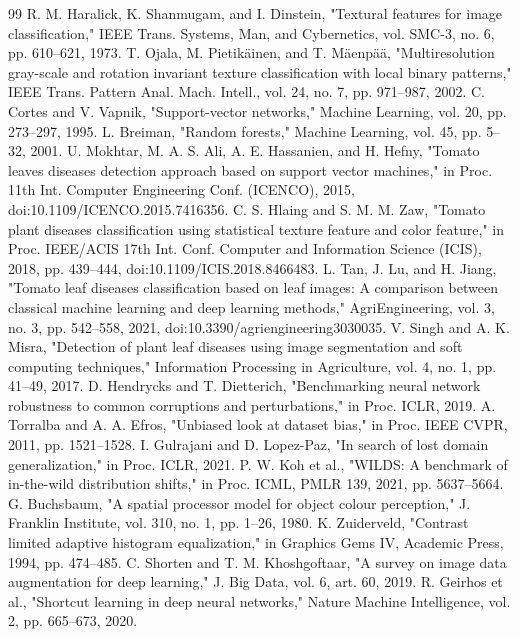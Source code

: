 \documentclass[conference]{IEEEtran}
\begin{document}
\begin{thebibliography}{99}
 R. M. Haralick, K. Shanmugam, and I. Dinstein, "Textural features for image classification," IEEE Trans. Systems, Man, and Cybernetics, vol. SMC-3, no. 6, pp. 610--621, 1973.
 T. Ojala, M. Pietikäinen, and T. Mäenpää, "Multiresolution gray-scale and rotation invariant texture classification with local binary patterns," IEEE Trans. Pattern Anal. Mach. Intell., vol. 24, no. 7, pp. 971--987, 2002.
 C. Cortes and V. Vapnik, "Support-vector networks," Machine Learning, vol. 20, pp. 273--297, 1995.
 L. Breiman, "Random forests," Machine Learning, vol. 45, pp. 5--32, 2001.
 U. Mokhtar, M. A. S. Ali, A. E. Hassanien, and H. Hefny, "Tomato leaves diseases detection approach based on support vector machines," in Proc. 11th Int. Computer Engineering Conf. (ICENCO), 2015, doi:10.1109/ICENCO.2015.7416356.
 C. S. Hlaing and S. M. M. Zaw, "Tomato plant diseases classification using statistical texture feature and color feature," in Proc. IEEE/ACIS 17th Int. Conf. Computer and Information Science (ICIS), 2018, pp. 439--444, doi:10.1109/ICIS.2018.8466483.
 L. Tan, J. Lu, and H. Jiang, "Tomato leaf diseases classification based on leaf images: A comparison between classical machine learning and deep learning methods," AgriEngineering, vol. 3, no. 3, pp. 542--558, 2021, doi:10.3390/agriengineering3030035.
 V. Singh and A. K. Misra, "Detection of plant leaf diseases using image segmentation and soft computing techniques," Information Processing in Agriculture, vol. 4, no. 1, pp. 41--49, 2017.
 D. Hendrycks and T. Dietterich, "Benchmarking neural network robustness to common corruptions and perturbations," in Proc. ICLR, 2019.
 A. Torralba and A. A. Efros, "Unbiased look at dataset bias," in Proc. IEEE CVPR, 2011, pp. 1521--1528.
 I. Gulrajani and D. Lopez-Paz, "In search of lost domain generalization," in Proc. ICLR, 2021.
 P. W. Koh et al., "WILDS: A benchmark of in-the-wild distribution shifts," in Proc. ICML, PMLR 139, 2021, pp. 5637--5664.
 G. Buchsbaum, "A spatial processor model for object colour perception," J. Franklin Institute, vol. 310, no. 1, pp. 1--26, 1980.
 K. Zuiderveld, "Contrast limited adaptive histogram equalization," in Graphics Gems IV, Academic Press, 1994, pp. 474--485.
 C. Shorten and T. M. Khoshgoftaar, "A survey on image data augmentation for deep learning," J. Big Data, vol. 6, art. 60, 2019.
 R. Geirhos et al., "Shortcut learning in deep neural networks," Nature Machine Intelligence, vol. 2, pp. 665--673, 2020.

\end{thebibliography}
\end{document}
